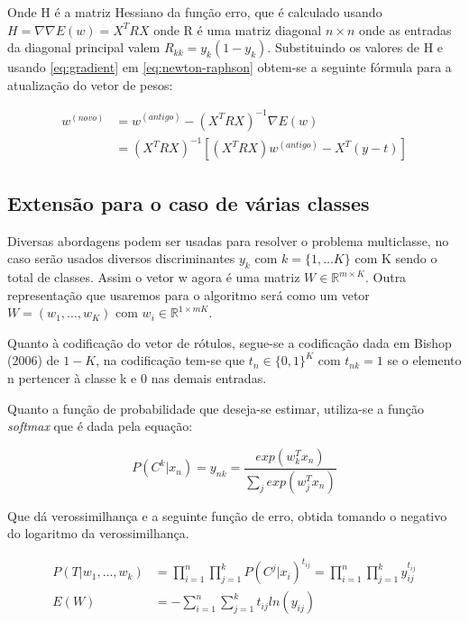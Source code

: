 Onde H é a matriz Hessiano da função erro, que é calculado usando $H = \nabla \nabla E(w)
= X^TRX$ onde R é uma matriz diagonal $n \times n$ onde as entradas da diagonal principal
valem $R_{kk} = y_k(1 - y_k)$. Substituindo os valores de H e usando
\ref{eq:gradient} em \ref{eq:newton-raphson} obtem-se a seguinte fórmula para a atualização
do vetor de pesos:


\begin{equation}
\begin{split}
w^{ (novo) } & = w^{ (antigo) } - (X^T R X)^{-1} \nabla E(w) \\
	& = (X^T R X)^{-1}[(X^T R X)w^{ (antigo) } - X^T(y - t)]  
\end{split}
\end{equation}

\subsection{Extensão para o caso de várias classes}

Diversas abordagens podem ser usadas para resolver o problema multiclasse, no
caso serão usados diversos discriminantes $y_k$ com $k = \{1, \ldots K\}$ com K
sendo o total de classes. Assim o vetor w agora é uma matriz
$W \in \mathbb{R}^{m \times K}$. Outra representação que usaremos para o algoritmo
será como um vetor $W = (w_1, \ldots, w_K)$ com $w_i \in \mathbb{R}^{1 \times mK}$.

Quanto à codificação do vetor de rótulos, 
segue-se a codificação dada em Bishop (2006)\cite{bishop2006} de $1-K$,
na codificação tem-se que $t_n \in \{0, 1\}^K$ com $t_{nk} = 1$ se o elemento
n pertencer à classe k e 0 nas demais entradas. 

Quanto a função de probabilidade que deseja-se estimar, utiliza-se a função
\textit{softmax} que é dada pela equação:

\begin{center}
	\begin{equation}
		P(C^k | x_n) = y_{nk} = \frac{exp(w_k^Tx_n)}{\sum_j exp(w_j^Tx_n)} 
	\end{equation}
\end{center}

Que dá verossimilhança e a seguinte função de erro, obtida
tomando o negativo do logaritmo da verossimilhança.

\begin{center}
	\begin{align*}
				P(T | w_1, \ldots, w_k) &= \prod_{i = 1}^{n} \prod_{j = 1}^{k} P(C^j | x_i)^{t_{ij}} = \prod_{i = 1}^{n} \prod_{j = 1}^{k} y_{ij}^{t_{ij}} \\
		E(W) &= - \sum_{i = 1}^{n} \sum_{j = 1}^{k} t_{ij} ln(y_{ij})	
	\end{align*}
\end{center}

